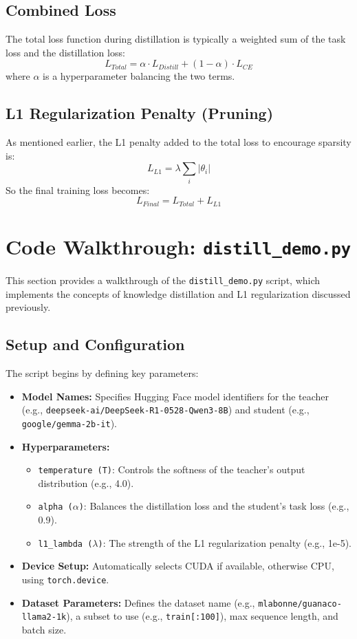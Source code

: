 \documentclass{article}
\begin{document}
\subsection{Combined Loss}
The total loss function during distillation is typically a weighted sum of the task loss and the distillation loss:
$$ L_{Total} = \alpha \cdot L_{Distill} + (1 - \alpha) \cdot L_{CE} $$
where $\alpha$ is a hyperparameter balancing the two terms.

\subsection{L1 Regularization Penalty (Pruning)}
As mentioned earlier, the L1 penalty added to the total loss to encourage sparsity is:
$$ L_{L1} = \lambda \sum_i |\theta_i| $$
So the final training loss becomes:
$$ L_{Final} = L_{Total} + L_{L1} $$

\section{Code Walkthrough: \texttt{distill\_demo.py}}
This section provides a walkthrough of the \texttt{distill\_demo.py} script, which implements the concepts of knowledge distillation and L1 regularization discussed previously.

\subsection{Setup and Configuration}
The script begins by defining key parameters:
\begin{itemize}
    \item \textbf{Model Names:} Specifies Hugging Face model identifiers for the teacher (e.g., \texttt{deepseek-ai/DeepSeek-R1-0528-Qwen3-8B}) and student (e.g., \texttt{google/gemma-2b-it}).
    \item \textbf{Hyperparameters:}
    \begin{itemize}
        \item \texttt{temperature (T)}: Controls the softness of the teacher's output distribution (e.g., 4.0).
        \item \texttt{alpha ($\alpha$)}: Balances the distillation loss and the student's task loss (e.g., 0.9).
        \item \texttt{l1\_lambda ($\lambda$)}: The strength of the L1 regularization penalty (e.g., 1e-5).
    \end{itemize}
    \item \textbf{Device Setup:} Automatically selects CUDA if available, otherwise CPU, using \texttt{torch.device}.
    \item \textbf{Dataset Parameters:} Defines the dataset name (e.g., \texttt{mlabonne/guanaco-llama2-1k}), a subset to use (e.g., \texttt{train[:100]}), max sequence length, and batch size.
\end{itemize}
\end{document}
